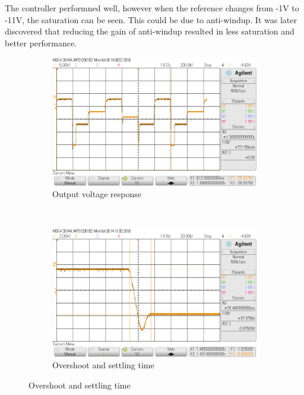 The controller performned well, however when the reference changes from -1V to -11V, the saturation can be seen. This could be due to anti-windup. It was later discovered that reducing the gain of anti-windup resulted in less saturation and better performance. 
\begin{figure}[H]
    \begin{framed}
    \captionsetup[subfigure]{justification = centering}
    \centering
    \begin{subfigure}[b]{0.8\textwidth}
    \centering\includegraphics[width = \textwidth]{figures/result/changeRef.png}
    \caption{Output voltage response}
    \end{subfigure}
    \\[11pt]
    \begin{subfigure}[b]{0.45\textwidth}
    \centering
    \includegraphics[width = \textwidth]{figures/result/overshoot1to8.png}
    \caption{Overshoot and settling time}

\end{subfigure}
\end{framed}
\end{figure}
